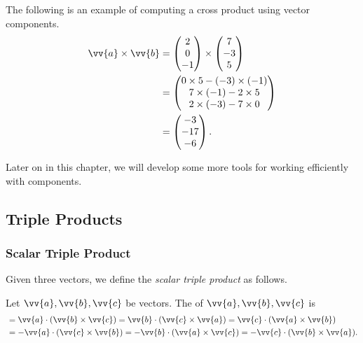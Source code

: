 \begin{example}
    The following is an example of computing a cross product using vector components.
    \begin{align*}
        \vv{a} \times \vv{b} &= \begin{pmatrix}2 \\ 0 \\ -1\end{pmatrix}\times\begin{pmatrix}7 \\ -3 \\ 5\end{pmatrix} \\
        &= \begin{pmatrix}
            0 \times 5 - (-3) \times (-1) \\
            7 \times (-1) - 2 \times 5 \\
            2 \times (-3) - 7 \times 0
        \end{pmatrix} \\
        &= \begin{pmatrix}
            -3 \\ -17 \\ -6
        \end{pmatrix}.
    \end{align*}
\end{example}


Later on in this chapter, we will develop some more tools for working efficiently with components.

\subsection{Triple Products}

\subsubsection{Scalar Triple Product}

Given three vectors, we define the \emph{scalar triple product} as follows.

\begin{definition}
    Let $\vv{a}, \vv{b}, \vv{c}$ be vectors. The  of $\vv{a}, \vv{b}, \vv{c}$ is
    \begin{align*}
        [\vv{a}, \vv{b}, \vv{c}] &= \vv{a} \cdot ( \vv{b} \times \vv{c}) =  \vv{b} \cdot ( \vv{c} \times \vv{a}) =  \vv{c} \cdot ( \vv{a} \times \vv{b}) \\
    &= - \vv{a} \cdot ( \vv{c} \times \vv{b}) =  -\vv{b} \cdot ( \vv{a} \times \vv{c}) =  -\vv{c} \cdot ( \vv{b} \times \vv{a}).
    \end{align*}
\end{definition}

